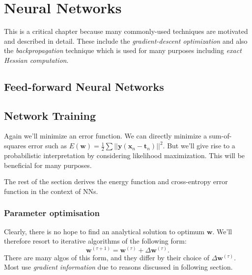 \documentclass[a4paper]{article}
\newcommand{\mb}{\mathbf}
\begin{document}
\section{Neural Networks}
This is a critical chapter because many commonly-used techniques are motivated and described in detail. These include the \textit{gradient-descent optimization} and also the \textit{backpropagation} technique which is used for many purposes including \textit{exact Hessian computation}. 

\subsection{Feed-forward Neural Networks}
\subsection{Network Training}
Again we'll minimize an error function. We can directly minimize a sum-of-squares error such as $E(\mb{w}) = \frac{1}{2}\sum||\mb{y}(\mb{x}_n-\mb{t}_n)||^2$. But we'll give rise to a probabilistic interpretation by considering likelihood maximization. This will be beneficial for many purposes.

The rest of the section derives the energy function and cross-entropy error function in the context of NNs.

\subsubsection{Parameter optimisation}
Clearly, there is no hope to find an analytical solution to optimum $\mb{w}$. We'll therefore resort to iterative algorithms of the following form:
%
\begin{equation}
\mb{w}^{(\tau+1)}=\mb{w}^{(\tau)}+\Delta \mb{w}^{(\tau)}.
\end{equation}
%
There are many algos of this form, and they differ by their choice of $\Delta\mb{w}^{(\tau)}$. Most use \textit{gradient information} due to reasons discussed in following section.
\end{document}
